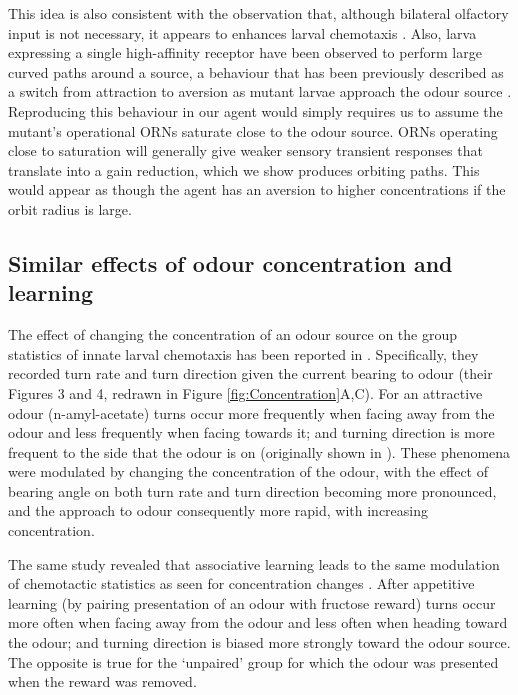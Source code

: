 \documentclass[11pt,a4paper]{article}
\begin{document}
 This idea is also consistent with the observation that, although bilateral olfactory input is not necessary, it appears to enhances larval chemotaxis \citep{louis2008bilateral}. Also, larva expressing a single high-affinity receptor have been observed to perform large curved paths around a source, a behaviour that has been previously described as a switch from attraction to aversion as mutant larvae approach the odour source \citep{gomez2011active, kreher2008translation}. %
  Reproducing this behaviour in our agent would simply requires us to assume the mutant's operational ORNs saturate close to the odour source. ORNs operating close to saturation will generally give weaker sensory transient responses that translate into a gain reduction, which we show produces orbiting paths. This would appear as though the agent has an aversion to higher concentrations if the orbit radius is large.
 
 


\subsection{Similar effects of odour concentration and learning}
The effect of changing the concentration of an odour source on the group statistics of innate larval chemotaxis has been reported in \citep{schleyer2015learning}. Specifically, they recorded turn rate and turn direction given the current bearing to odour (their Figures 3 and 4, redrawn in Figure \ref{fig:Concentration}A,C). For an attractive odour (n-amyl-acetate) turns occur more frequently when facing away from the odour and less frequently when facing towards it; and turning direction is more frequent to the side that the odour is on (originally shown in \citet{gomez2011active}). These phenomena were modulated by changing the concentration of the odour, with the effect of bearing angle on both turn rate and turn direction becoming more pronounced, and the approach to odour consequently more rapid, with increasing concentration. 

The same \cite{schleyer2015learning} study revealed that associative learning leads to the same modulation of chemotactic statistics as seen for concentration changes \citep[][Figures 3 and 4]{schleyer2015learning}. After appetitive learning (by pairing presentation of an odour with fructose reward) turns occur more often when facing away from the odour and less often when heading toward the odour; and turning direction is biased more strongly toward the odour source. The opposite is true for the ‘unpaired’ group for which the odour was presented when the reward was removed. 
\end{document}
